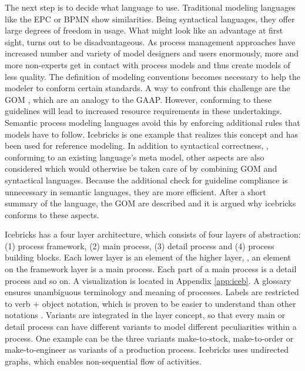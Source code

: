 	 The next step is to decide what language to use. Traditional modeling languages like the \acrfull{EPC} or \acrfull{BPMN} show similarities. Being syntactical languages, they offer large degrees of freedom in usage. What might look like an advantage at first sight, turns out to be disadvantageous. As process management approaches have increased number and variety of model designers and users enormously, more and more non-experts get in contact with process models and thus create models of less quality. The definition of modeling conventions becomes necessary to help the modeler to conform certain standards. A way to confront this challenge are the \acrfull{GOM} \citep{BeckerGOM2012}, which are an analogy to the \acrfull{GAAP}. However, conforming to these guidelines will lead to increased resource requirements in these undertakings. Semantic process modeling languages avoid this by enforcing additional rules that models have to follow. Icebricks \citep{clever2016} is one example that realizes this concept and has been used for reference modeling. In addition to syntactical correctness, \ie, conforming to an existing language's meta model, other aspects are also considered which would otherwise be taken care of by combining \acrshort{GOM} and syntactical languages. Because the additional check for guideline compliance is unnecessary in semantic languages, they are more efficient. After a short summary of the language,  the \acrshort{GOM} are described and it is argued why icebricks conforms to these aspects. 
	 
	 Icebricks has a four layer architecture, which consists of four layers of abstraction: (1) process framework, (2) main process, (3) detail process and (4) process building blocks. Each lower layer is an element of the higher layer, \ie, an element on the framework layer is a main process. Each part of a main process is a detail process and so on. A  visualization is located in Appendix \ref{app:iceb}. A glossary ensures unambiguous terminology and meaning of processes. Labels are restricted to verb + object notation, which is proven to be easier to understand than other notations \citep{Mendling_2010}. Variants are integrated in the layer concept, so that every main or detail process can have different variants to model different peculiarities within a process. One example can be the three variants make-to-stock, make-to-order or make-to-engineer as variants of a production process. Icebricks uses undirected graphs, which enables non-sequential flow of activities. 
	 
